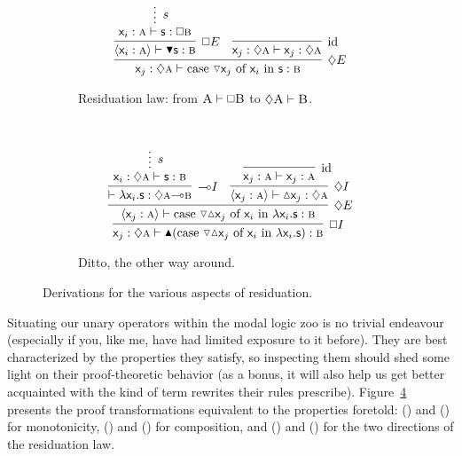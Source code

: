 \begin{figure}
\begin{subfigure}{0.5\textwidth}
		\label{subfigure:modal_properties:interior}
	\end{subfigure}\\[\smallsep]
	\begin{subfigure}{1\textwidth}
		\[
			\infer[\diamond E]{\term{\varj}: \diamond \prop{a} \vdash \caseof{\diaelim \varj}{\vari }{s}:\prop{b}}{
				\infer[\bx E]{\bracket{\term{\vari }: \prop{a}} \vdash \boxelim\term{s}: \prop{b}}{
					\infer*[s]{\term{\vari }: \prop{a} \vdash \term{s}: \bx\prop{b}}{}
				}
				&
				\infer[\Ax]{\term{\varj}: \diamond \prop{a} \vdash \term{\varj}: \diamond \prop{a}}{}
			}
		\]
	\caption{Residuation law: from $\smallprop{A} \vdash \bx\smallprop{B}$ to $\diamond\smallprop{A} \vdash \smallprop{B}$.}
	\label{subfigure:modal_properties:residuation:1}	
	\end{subfigure}\\[\smallsep]
	\begin{subfigure}{1\textwidth}
		\[
			\infer[\bx I]{\term{\varj}: \diamond \prop{a} \vdash \boxintro(\caseof{\diaelim \diaintro \varj}{\vari }{\lam \vari .s}): \prop{b}}{
				\infer[\diamond E]{\bracket{\term{\varj}: \prop{a}} \vdash \caseof{\diaelim \diaintro \varj}{\vari }{\lam \vari .s}: \prop{b}}{
					\infer[\li I]{\vdash \term{\lam \vari .s}: \diamond\prop{a} \li \prop{b}}{
						\infer*[s]{\term{\vari }: \diamond\prop{a} \vdash \term{s}: \prop{b}}{}
					}
					&
					\infer[\diamond I]{\bracket{\term{\varj}: \prop{a}} \vdash \term{\diaintro \varj}: \diamond \prop{a}}{
						\infer[\Ax]{\term{\varj}: \prop{a} \vdash \term{\varj}: \prop{a}}{}
					}
				}
			}
		\]
		\caption{Ditto, the other way around.}
		\label{subfigure:modal_properties:residuation:2}	
	\end{subfigure}
	\caption{Derivations for the various aspects of residuation.}
	\label{figure:modal_properties:residuation}
\end{figure}

Situating our unary operators within the modal logic zoo is no trivial endeavour (especially if you, like me, have had limited exposure to it before).
They are best characterized by the properties they satisfy, so inspecting them should shed some light on their proof-theoretic behavior (as a bonus, it will also help us get better acquainted with the kind of term rewrites their rules prescribe).
Figure~\ref{figure:modal_properties:residuation} presents the proof transformations equivalent to the properties foretold:
 () and () for monotonicity, () and () for composition, and () and () for the two directions of the residuation law.
 
